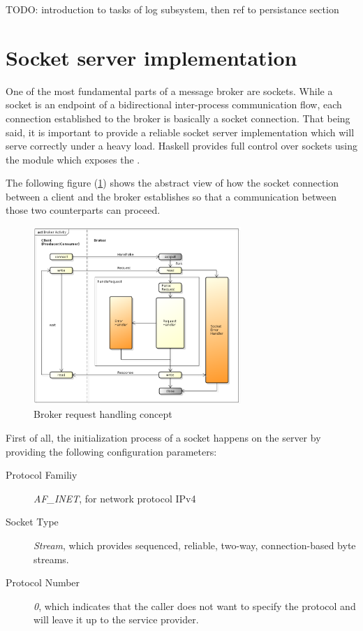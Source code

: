 TODO: introduction to tasks of log subsystem, then ref to persistance section


\section{Socket server implementation}

One of the most fundamental parts of a message broker are sockets. While a
socket is an endpoint of a bidirectional inter-process communication flow, each
connection established to the broker is basically a socket connection. That
being said, it is important to provide a reliable socket server implementation
which will serve correctly under a heavy load. Haskell provides full control
over sockets using the
module which exposes the .

The following figure (\ref{fig:broker-activity}) shows the abstract view of how
the socket connection between a client and the broker establishes so that a
communication between those two counterparts can proceed.

\begin{figure}[H]
    \centering
    \includegraphics[width=0.7\textwidth]{images/broker-activity.png}
    \caption{Broker request handling concept}
    \label{fig:broker-activity}
\end{figure}

First of all, the initialization process of a socket happens on the server by providing the following configuration parameters:
\begin{description}
  \item[Protocol Familiy] \textit{AF\_INET}, for network protocol IPv4
  \item[Socket Type] \textit{Stream}, which provides sequenced, reliable, two-way, connection-based byte streams.
  \item[Protocol Number] \textit{0}, which indicates that the caller does not want to specify the protocol and will leave it up to the service provider.
\end{description}

